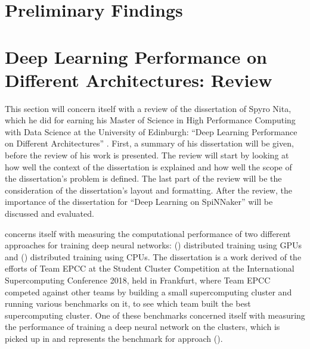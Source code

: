 \documentclass{article}
\begin{document}

\section{Preliminary Findings} %
\label{sec:prelim}






\section{Deep Learning Performance on Different %
  Architectures: Review}
\label{sec:review}

This section will concern itself with a review of the
dissertation of Spyro Nita, which he did for earning his
Master of Science in High Performance Computing with Data
Science at the University of Edinburgh:
``Deep Learning Performance on Different Architectures''
 \citep{nita_2018}.
First, a summary of his dissertation will be given, before
the review of his work is presented.
The review will start by looking at how well the context
of the dissertation is explained and how well the scope
of the dissertation's problem is defined.
The last part of the review will be the consideration of
the dissertation's layout and formatting.
After the review, the importance of the dissertation for
``Deep Learning on SpiNNaker'' will be discussed and
evaluated.

\citet{nita_2018} concerns itself with measuring the
computational performance of two different approaches for
training deep neural networks: ()
distributed training using GPUs and ()
distributed training using CPUs.
The dissertation is a work derived of the efforts of
Team EPCC at the Student Cluster Competition at the
International Supercomputing Conference 2018, held in
Frankfurt, where Team EPCC competed against other teams by
building a small supercomputing cluster and running various
benchmarks on it, to see which team built the best
supercomputing cluster.
One of these benchmarks concerned itself with measuring the
performance of training a deep neural network on the
clusters, which is picked up in \citet{nita_2018} and
represents the benchmark for approach ().
\end{document}
